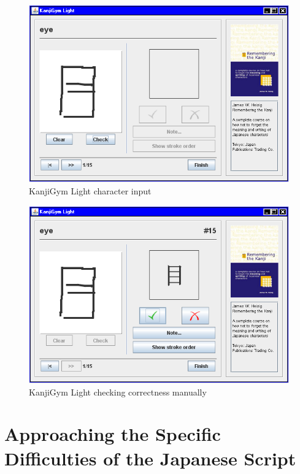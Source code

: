 \begin{figure}[htbp]
\begin{center}
\includegraphics[scale=0.7]{images/ConceptualDesign/kanjigym/input.png}
\caption{KanjiGym Light character input}
\label{fig:kanjigym:input}
\end{center}
\end{figure}

\begin{figure}[htbp]
\begin{center}
\includegraphics[scale=0.7]{images/ConceptualDesign/kanjigym/check.png}
\caption{KanjiGym Light checking correctness manually}
\label{fig:kanjigym:check}
\end{center}
\end{figure}

\section{Approaching the Specific Difficulties of the Japanese Script}
\label{sec:concept:tacklingdifficulties}

